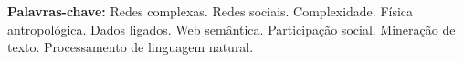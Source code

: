 \documentclass[a4paper,openright,12pt]{report} %
\begin{document}
\begin{singlespace}

\vspace*{1.5cm}
\hspace*{-0.9cm} {\bf Palavras-chave:} Redes complexas. Redes sociais. Complexidade. Física antropológica.
Dados ligados. Web semântica. Participação social. Mineração de texto. Processamento de linguagem natural.

\end{singlespace}

  

%
%

\end{document}
